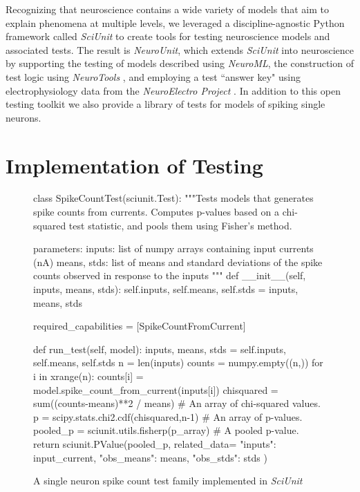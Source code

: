 \documentclass[11pt,letterpaper]{article}
\begin{document}
Recognizing that neuroscience contains a wide variety of models that aim to explain phenomena at multiple levels, we leveraged a discipline-agnostic Python framework called \textit{SciUnit}\cite{sciunit_url} to create tools for testing neuroscience models and associated tests.  The result is \textit{NeuroUnit}, which extends \textit{SciUnit} into neuroscience by supporting the testing of models described using \textit{NeuroML}, the construction of test logic using \textit{NeuroTools} \cite{neurotools_url}, and employing a test ``answer key" using electrophysiology data from the \textit{NeuroElectro Project} \cite{neuroelectro_url}.  In addition to this open testing toolkit we also provide a library of tests for models of spiking single neurons.  

\section{Implementation of Testing}

\begin{figure}
\small
\begin{python}
class SpikeCountTest(sciunit.Test):
  """Tests models that generates spike counts from currents. Computes p-values based on a chi-squared test statistic, and pools them using Fisher's method.

  parameters:
    inputs: list of numpy arrays containing input currents (nA)
    means, stds: list of means and standard deviations of the 
      spike counts observed in response to the inputs
  """
  def __init__(self, inputs, means, stds):
    self.inputs, self.means, self.stds = inputs, means, stds
	
  required_capabilities = [SpikeCountFromCurrent]
	
  def run_test(self, model):
    inputs, means, stds = self.inputs, self.means, self.stds
    n = len(inputs)
    counts = numpy.empty((n,))
    for i in xrange(n):
      counts[i] = model.spike_count_from_current(inputs[i])
    chisquared = sum((counts-means)**2 / means) # An array of chi-squared values.  
    p = scipy.stats.chi2.cdf(chisquared,n-1) # An array of p-values.  
    pooled_p = sciunit.utils.fisherp(p_array) # A pooled p-value.  
    return sciunit.PValue(pooled_p, related_data={
      "inputs": input_current,
      "obs_means": means,
      "obs_stds": stds
    })
\end{python}
\vspace{-5px}
\caption{A single neuron spike count test family implemented in \textit{SciUnit}}
\label{fig:rate_test}
\vspace{-15px}
\end{figure}
\end{document}
